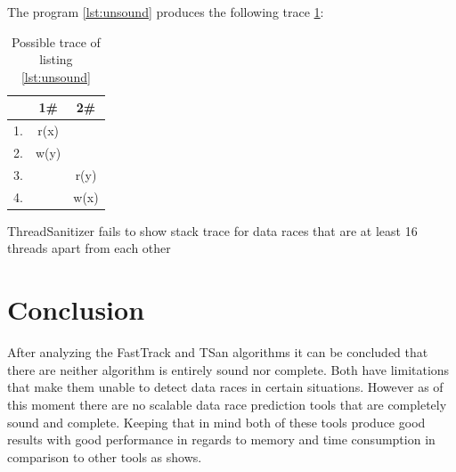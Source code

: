 \documentclass[12pt]{article}
\begin{document}
	
	The program \ref{lst:unsound} produces the following trace \ref{trace3}:
	\begin{table}[H]
		\begin{center}
			\begin{tabular}{ c c c}
				& 1\# & 2\# \\
				\hline
				1. & r(x) & \\
				2. & w(y) & \\
				3. & & r(y) \\
				4. & & w(x) \\
			\end{tabular}
			\caption{Possible trace of listing \ref{lst:unsound}}
			\label{trace3}
		\end{center}
	\end{table}
	
	
	ThreadSanitizer fails to show stack trace for data races that are at least 16 threads apart from each other
	
	
	
	\section{Conclusion}
	After analyzing the FastTrack and TSan algorithms it can be concluded that there are neither algorithm is entirely sound nor complete. Both have limitations that make them unable to detect data races in certain situations. However as of this moment there are no scalable data race prediction tools that are completely sound and complete. Keeping that in mind both of these tools produce good results with good performance in regards to memory and time consumption in comparison to other tools as \cite{flanagan} shows.
	\newpage                                          
	\printbibliography[heading= bibintoc, title={List of Literature}]
	\newpage
	{\hypersetup{linkcolor=black}
		\listoffigures
		\newpage
		\listoftables
		\newpage
		\lstlistoflistings
	}
\end{document}
